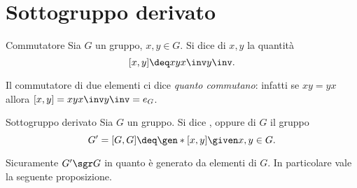 \section{Sottogruppo derivato}

\begin{definition}
    {Commutatore}{}
    Sia $G$ un gruppo, $x, y \in G$. Si dice  di $x, y$ la quantità \[
        [x, y] \deq xyx\inv y\inv.
    \]
\end{definition}

Il commutatore di due elementi ci dice \emph{quanto commutano}: infatti se $xy = yx$ allora $[x, y] = xyx\inv y\inv = e_G$.

\begin{definition}{Sottogruppo derivato}{}
    Sia $G$ un gruppo. Si dice , oppure  di $G$ il gruppo \[
        G' = [G, G] \deq \gen*{[x, y] \given x, y \in G}.
    \]
\end{definition}

Sicuramente $G' \sgr G$ in quanto è generato da elementi di $G$. In particolare vale la seguente proposizione.

